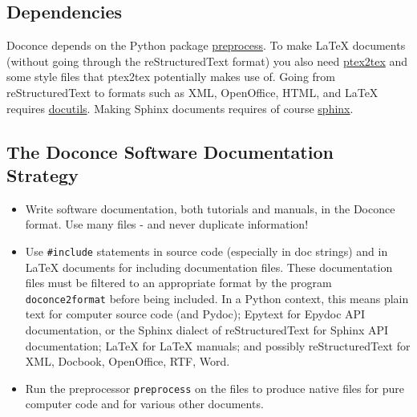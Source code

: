 \documentclass{article}
\begin{document}
\subsection{Dependencies}

Doconce depends on the Python package
\href{http://code.google.com/p/preprocess/}{preprocess}.  To make {\LaTeX}
documents (without going through the reStructuredText format) you also
need \href{http://code.google.com/p/ptex2tex}{ptex2tex} and some style files
that ptex2tex potentially makes use of.  Going from reStructuredText
to formats such as XML, OpenOffice, HTML, and {\LaTeX} requires
\href{http://docutils.sourceforge.net/}{docutils}.  Making Sphinx documents
requires of course \href{http://sphinx.pocoo.org}{sphinx}.

\subsection{The Doconce Software Documentation Strategy}

\label{doconce:strategy}

\begin{itemize}
   \item Write software documentation, both tutorials and manuals, in
     the Doconce format. Use many files - and never duplicate information!

   \item Use {\fontsize{10pt}{10pt}\verb!#include!} statements in source code (especially in doc
     strings) and in {\LaTeX} documents for including documentation
     files.  These documentation files must be filtered to an
     appropriate format by the program {\fontsize{10pt}{10pt}\verb!doconce2format!} before being
     included. In a Python context, this means plain text for computer
     source code (and Pydoc); Epytext for Epydoc API documentation, or
     the Sphinx dialect of reStructuredText for Sphinx API
     documentation; {\LaTeX} for {\LaTeX} manuals; and possibly
     reStructuredText for XML, Docbook, OpenOffice, RTF, Word.

   \item Run the preprocessor {\fontsize{10pt}{10pt}\verb!preprocess!} on the files to produce native
     files for pure computer code and for various other documents.
\end{itemize}
\end{document}
